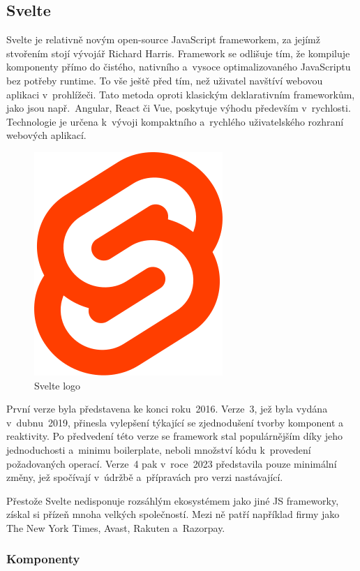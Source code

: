 \subsection{Svelte}

Svelte je relativně novým open-source JavaScript frameworkem, za jejímž stvořením stojí vývojář Richard Harris. 
Framework se odlišuje tím, že kompiluje komponenty přímo do čistého, nativního a~vysoce optimalizovaného JavaScriptu bez potřeby runtime. 
To vše ještě před tím, než uživatel navštíví webovou aplikaci v~prohlížeči. 
Tato metoda oproti klasickým deklarativním frameworkům, jako jsou např.~Angular, React či Vue, poskytuje výhodu především v~rychlosti. 
Technologie je určena k~vývoji kompaktního a~rychlého uživatelského rozhraní webových aplikací.\cite{sveltemdn,svelte,sveltedevinterface}

\begin{figure}[htb]
	\centering
		\includegraphics[width=.18\textwidth]{images/svelte-logo.png}
	\caption[Svelte logo]{Svelte logo \cite{svelte}}
	\label{fig:sveltelogo}
\end{figure}

První verze byla představena ke konci roku~2016. Verze~3, jež byla vydána v~dubnu~2019, přinesla vylepšení týkající se zjednodušení tvorby komponent a reaktivity. 
Po předvedení této verze se framework stal populárnějším díky jeho jednoduchosti a~minimu boilerplate, neboli množství kódu k~provedení požadovaných operací. 
Verze~4 pak v~roce~2023 představila pouze minimální změny, jež spočívají v~údržbě a~přípravách pro verzi nastávající.

Přestože Svelte nedisponuje rozsáhlým ekosystémem jako jiné JS frameworky, získal si přízeň mnoha velkých společností. 
Mezi ně patří například firmy jako The New York Times, Avast, Rakuten a~Razorpay.\cite{sveltemdn,svelte,sveltedevinterface}

\subsubsection{Komponenty}

